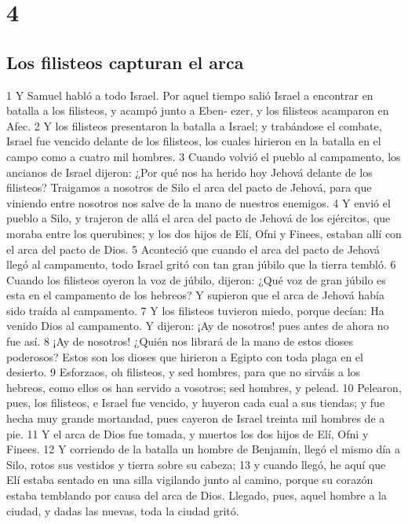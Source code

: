 \chapter{4}

\section*{Los filisteos capturan el arca}

1 Y Samuel habló a todo Israel. Por aquel tiempo salió Israel a encontrar en batalla a los filisteos, y acampó junto a Eben- ezer, y los filisteos acamparon en Afec.
2 Y los filisteos presentaron la batalla a Israel; y trabándose el combate, Israel fue vencido delante de los filisteos, los cuales hirieron en la batalla en el campo como a cuatro mil hombres.
3 Cuando volvió el pueblo al campamento, los ancianos de Israel dijeron: ¿Por qué nos ha herido hoy Jehová delante de los filisteos? Traigamos a nosotros de Silo el arca del pacto de Jehová, para que viniendo entre nosotros nos salve de la mano de nuestros enemigos.
4 Y envió el pueblo a Silo, y trajeron de allá el arca del pacto de Jehová de los ejércitos, que moraba entre los querubines; y los dos hijos de Elí, Ofni y Finees, estaban allí con el arca del pacto de Dios. 
5 Aconteció que cuando el arca del pacto de Jehová llegó al campamento, todo Israel gritó con tan gran júbilo que la tierra tembló.
6 Cuando los filisteos oyeron la voz de júbilo, dijeron: ¿Qué voz de gran júbilo es esta en el campamento de los hebreos? Y supieron que el arca de Jehová había sido traída al campamento.
7 Y los filisteos tuvieron miedo, porque decían: Ha venido Dios al campamento. Y dijeron: ¡Ay de nosotros! pues antes de ahora no fue así.
8 ¡Ay de nosotros! ¿Quién nos librará de la mano de estos dioses poderosos? Estos son los dioses que hirieron a Egipto con toda plaga en el desierto.
9 Esforzaos, oh filisteos, y sed hombres, para que no sirváis a los hebreos, como ellos os han servido a vosotros; sed hombres, y pelead.
10 Pelearon, pues, los filisteos, e Israel fue vencido, y huyeron cada cual a sus tiendas; y fue hecha muy grande mortandad, pues cayeron de Israel treinta mil hombres de a pie.
11 Y el arca de Dios fue tomada, y muertos los dos hijos de Elí, Ofni y Finees.
12 Y corriendo de la batalla un hombre de Benjamín, llegó el mismo día a Silo, rotos sus vestidos y tierra sobre su cabeza;
13 y cuando llegó, he aquí que Elí estaba sentado en una silla vigilando junto al camino, porque su corazón estaba temblando por causa del arca de Dios. Llegado, pues, aquel hombre a la ciudad, y dadas las nuevas, toda la ciudad gritó.
